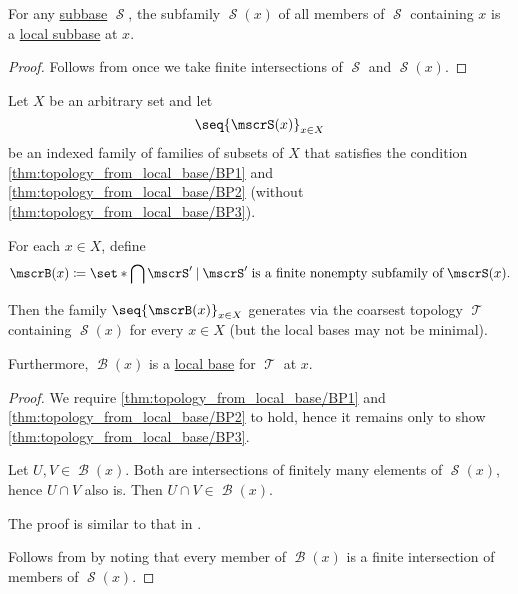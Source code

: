 \begin{proposition}\label{thm:global_subbase_to_local_subbase}
  For any \hyperref[def:topological_subbase]{subbase} \( \mscrS \), the subfamily \( \mscrS(x) \) of all members of \( \mscrS \) containing \( x \) is a \hyperref[def:topological_local_subbase]{local subbase} at \( x \).
\end{proposition}
\begin{proof}
  Follows from  once we take finite intersections of \( \mscrS \) and \( \mscrS(x) \).
\end{proof}

\begin{proposition}\label{thm:topology_from_local_subbase}
  Let \( X \) be an arbitrary set and let
  \begin{equation*}
    \seq{ \mscrS(x) }_{x \in X}
  \end{equation*}
  be an indexed family of families of subsets of \( X \) that satisfies the condition \ref{thm:topology_from_local_base/BP1} and \ref{thm:topology_from_local_base/BP2} (without \ref{thm:topology_from_local_base/BP3}).

  For each \( x \in X \), define
  \begin{equation*}
    \mscrB(x) \coloneqq \set*{ \bigcap \mscrS' \given \mscrS' \T{is a finite nonempty subfamily of} \mscrS(x) }.
  \end{equation*}

  Then the family \( \seq{ \mscrB(x) }_{x \in X} \) generates via  the coarsest topology \( \mscrT \) containing \( \mscrS(x) \) for every \( x \in X \) (but the local bases may not be minimal).

  Furthermore, \( \mscrB(x) \) is a \hyperref[def:topological_local_base]{local base} for \( \mscrT \) at \( x \).
\end{proposition}
\begin{proof}
   We require \ref{thm:topology_from_local_base/BP1} and \ref{thm:topology_from_local_base/BP2} to hold, hence it remains only to show \ref{thm:topology_from_local_base/BP3}.

  Let \( U, V \in \mscrB(x) \). Both are intersections of finitely many elements of \( \mscrS(x) \), hence \( U \cap V \) also is. Then \( U \cap V \in \mscrB(x) \).

   The proof is similar to that in .

   Follows from  by noting that every member of \( \mscrB(x) \) is a finite intersection of members of \( \mscrS(x) \).
\end{proof}

